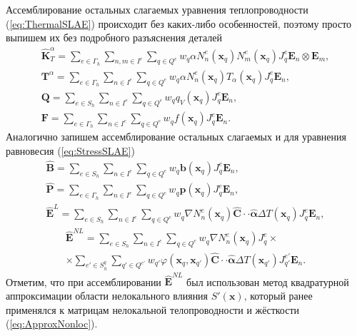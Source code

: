 Ассемблирование остальных слагаемых уравнения теплопроводности (\ref{eq:ThermalSLAE}) происходит без каких-либо особенностей, поэтому просто выпишем их без подробного разъяснения деталей
\begin{gather}
	\label{eq:HeatTransferMatrix}
	\widehat{\textbf{K}}^{\alpha}_T =
	\sum\limits_{e \in \Gamma_h}
	\sum\limits_{n,m \in I^{e}}
	\sum\limits_{q \in Q^e}
	w_q \alpha N_n^e (\boldsymbol{x}_q) N_m^e (\boldsymbol{x}_q) J_q^e \boldsymbol{E}_n \otimes \boldsymbol{E}_m,
	\\
	\label{eq:HeatTransferVector}
	\textbf{T}^{\alpha} =
	\sum\limits_{e \in \Gamma_h}
	\sum\limits_{n \in I^{e}}
	\sum\limits_{q \in Q^e}
	w_q \alpha N_n^e (\boldsymbol{x}_q) T_{\alpha} (\boldsymbol{x}_q) J_q^e \boldsymbol{E}_n,
	\\
	\label{eq:InnerFlux}
	\textbf{Q} =
	\sum\limits_{e \in S_h}
	\sum\limits_{n \in I^e}
	\sum\limits_{q \in Q^e}
	w_q q_V (\boldsymbol{x}_q) J_q^e \boldsymbol{E}_n,
	\\
	\label{eq:OuterFlux}
	\textbf{F} =
	\sum\limits_{e \in \Gamma_h}
	\sum\limits_{n \in I^e}
	\sum\limits_{q \in Q^e}
	w_q f (\boldsymbol{x}_q) J_q^e \boldsymbol{E}_n.
\end{gather}
Аналогично запишем ассемблирование остальных слагаемых и для уравнения равновесия (\ref{eq:StressSLAE})
\begin{gather}
	\label{eq:InnerPressure}
	\widehat{\textbf{B}} =
	\sum\limits_{e \in S_h}
	\sum\limits_{n \in I^e}
	\sum\limits_{q \in Q^e}
	w_q \boldsymbol{b} (\boldsymbol{x}_q) J_q^e \boldsymbol{E}_n,
	\\
	\label{eq:OuterPressure}
	\widehat{\textbf{P}} = 
	\sum\limits_{e \in \Gamma_h}
	\sum\limits_{n \in I^e}
	\sum\limits_{q \in Q^e}
	w_q \boldsymbol{p} (\boldsymbol{x}_q) J_q^e \boldsymbol{E}_n,
	\\
	\label{eq:LocalThermalExpansion}
	\widehat{\textbf{E}}^L = 
	\sum\limits_{e \in S_h}
	\sum\limits_{n \in I^e}
	\sum\limits_{q \in Q^e}
	w_q \nabla N_n^e (\boldsymbol{x}_q) \widehat{\mathbf{C}} \cdot \cdot \widehat{\boldsymbol{\alpha}} \Delta T (\boldsymbol{x}_q) J_q^e \boldsymbol{E}_n,
\end{gather}
\begin{multline}
	\label{eq:NonLocalThermalExpansion}
	\widehat{\textbf{E}}^{NL} = 
	\sum\limits_{e \in S_h}
	\sum\limits_{n \in I^e}
	\sum\limits_{q \in Q^e}
	w_q \nabla N_n^e (\boldsymbol{x}_q) J_q^e 
	\times \\ \times
	\sum\limits_{e' \in S_h^q}
	\sum\limits_{q' \in Q^{e'}}
	w_{q'} \varphi (\boldsymbol{x}_q, \boldsymbol{x}_{q'}) \widehat{\mathbf{C}} \cdot \cdot \widehat{\boldsymbol{\alpha}} \Delta T (\boldsymbol{x}_{q'}) J_{q'}^{e'} \boldsymbol{E}_n.
\end{multline}
Отметим, что при ассемблировании $\widehat{\textbf{E}}^{NL}$ был использован метод квадратурной аппроксимации области нелокального влияния $S'(\boldsymbol{x})$, который ранее применялся к матрицам нелокальной телопроводности и жёсткости (\ref{eq:ApproxNonloc}).

